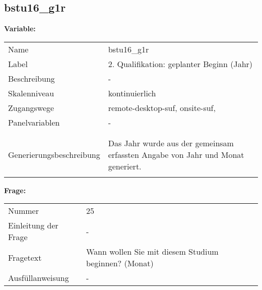 	
	
	\subsection{bstu16\_g1r}
	\label{subSection:bstu16_g1r}

	\noindent\textbf{Variable:}\\
		\begin{tabular}{lL{11.3cm}}
			\label{tableVariable:bstu16_g1r}
			Name & bstu16\_g1r \\
			Label & 2. Qualifikation: geplanter Beginn (Jahr) \\
			Beschreibung & - \\
			Skalenniveau & kontinuierlich \\
			Zugangswege &
				remote-desktop-suf,
				onsite-suf,
 \\
			Panelvariablen & -
			 \\
			 \\
 \\
					Generierungsbeschreibung & Das Jahr wurde aus der gemeinsam erfassten Angabe von Jahr und Monat generiert. 
				 \\	
			 \\
		\end{tabular}

		\vspace*{1 cm}
		\noindent\textbf{Frage:}\\
		\begin{tabular}{lL{11.3cm}}
			\label{tableQuestion:bstu16_g1r}
			Nummer & 25 \\
			Einleitung der Frage & - \\
			Fragetext & Wann wollen Sie mit diesem Studium beginnen? (Monat) \\
			Ausfüllanweisung & - \\
		\end{tabular}




